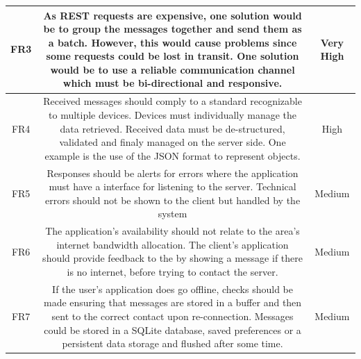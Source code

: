 \documentclass{article}
\begin{document}
\begin{table}[H]
\begin{tabularx}{17cm}{|c|C|c|}
	FR3&As REST requests are expensive, one solution would be to group the messages together and send them as a batch. However, this would cause problems since some requests could be lost in transit. One solution would be to use a reliable communication channel which must be bi-directional and responsive.    &  Very High   \\ \hline
	FR4& Received messages should comply to a standard recognizable to multiple devices. Devices must individually manage the data retrieved. Received data must be de-structured, validated and finaly managed on the server side. One example is the use of the JSON format to represent objects. & High   \\ \hline
	FR5& Responses should be alerts for errors where the application must have a interface for listening to the server. Technical errors should not be shown to the client but handled by the system & Medium    \\ \hline
	FR6& The application's availability should not relate to the area's internet bandwidth allocation. The client's application should provide feedback to the by showing a message if there is no internet, before trying to contact the server.  &Medium     \\ \hline
	FR7& If the user's application does go offline, checks should be made ensuring that messages are stored in a buffer and then sent to the correct contact upon re-connection. Messages could be stored in a SQLite database, saved preferences or a persistent data storage and flushed after some time. &  Medium   \\ \hline

\end{tabularx}
\end{table}
\end{document}
